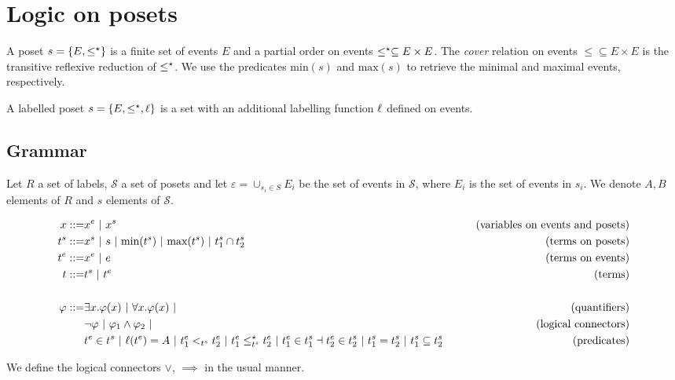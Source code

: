 \section{Logic on posets}

\begin{definition}[Poset]
  \label{def:poset}
  A poset $s=\{E,\leq^{\star}\}$ is a finite set of events $E$ and a partial order on events $\leq^{\star}\subseteq E\times E$. The \emph{cover} relation on events $\leq\subseteq E\times E$ is the transitive reflexive reduction of $\leq^{\star}$.
  We use the predicates $\text{min}(s)$ and $\text{max}(s)$ to retrieve the minimal and maximal events, respectively.

  A labelled poset $s=\{E,\leq^{\star},\ell\}$ is a set with an additional labelling function $\ell$ defined on events.
\end{definition}

\subsection{Grammar}

Let $R$ a set of labels, $\mathcal{S}$ a set of posets and let $\varepsilon = \cup_{s_i\in S} E_i$ be the set of events in $\mathcal{S}$, where $E_i$ is the set of events in $s_i$.
We denote $A,B$ elements of $R$ and $s$ elements of $\mathcal{S}$.

\begin{align*}
  x ::= & x^e ~|~ x^s & \tag{variables on events and posets} \\
  t^s ::= & x^s ~|~ s ~|~ \text{min}(t^s) ~|~ \text{max}(t^s) ~|~ t^s_1 \cap t^s_2 &\tag{terms on posets} \\
  t^e ::= & x^e ~|~ e & \tag{terms on events}\\
  t ::= & t^s ~|~ t^e & \tag{terms}\\
  \\
  \varphi ::= & \exists x.\varphi(x) ~|~ \forall x.\varphi(x) ~|&\tag{quantifiers}\\
  & \neg \varphi ~|~\varphi_1 \wedge \varphi_2~|&\tag{logical connectors}\\
  & t^e\in t^s ~|~ \ell(t^e) = A ~|~ t^e_1 <_{t^s} t^e_2 ~|~ t^e_1 \leq^{\star}_{t^s} t^e_2 ~|~ t^e_1\in t^s_1 \dashv t^e_2\in t^s_2~|~ t^s_1 = t^s_2 ~|~ t^s_1\subseteq t^s_2
  & \tag{predicates}\\
\end{align*}

We define the logical connectors $\vee$, $\implies$ in the usual manner.

